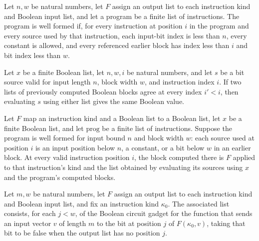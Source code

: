 \begin{definition}
\label{BoolCircuit.ProgWF}
\leanok
{}
Let $n,w$ be natural numbers, let $F$ assign an output list to each instruction kind and
Boolean input list, and let a program be a finite list of instructions. The program is
well formed if, for every instruction at position $i$ in the program and every source
used by that instruction, each input-bit index is less than $n$, every constant is
allowed, and every referenced earlier block has index less than $i$ and bit index less
than $w$.
\end{definition}

\begin{theorem}
\label{BoolCircuit.BitSrc.eval_congr}
\leanok
{}
Let $x$ be a finite Boolean list, let $n,w,i$ be natural numbers, and let $s$ be a bit
source valid for input length $n$, block width $w$, and instruction index $i$. If two
lists of previously computed Boolean blocks agree at every index $i'<i$, then evaluating
$s$ using either list gives the same Boolean value.
\end{theorem}

\begin{theorem}
\label{BoolCircuit.progBlocks_getD}
\leanok
{}
Let $F$ map an instruction kind and a Boolean list to a Boolean list, let $x$ be a
finite Boolean list, and let $\mathrm{prog}$ be a finite list of instructions. Suppose
the program is well formed for input bound $n$ and block width $w$: each source used at
position $i$ is an input position below $n$, a constant, or a bit below $w$ in an
earlier block. At every valid instruction position $i$, the block computed there is $F$
applied to that instruction's kind and the list obtained by evaluating its sources using
$x$ and the program's computed blocks.
\end{theorem}

\begin{definition}
\label{BoolCircuit.kindGadgets}
\leanok
{}
Let $m,w$ be natural numbers, let $F$ assign an output list to each instruction kind and
Boolean input list, and fix an instruction kind $\kappa_0$. The associated list
consists, for each $j<w$, of the Boolean circuit gadget for the function that sends an
input vector $v$ of length $m$ to the bit at position $j$ of $F(\kappa_0,v)$, taking
that bit to be false when the output list has no position $j$.
\end{definition}

